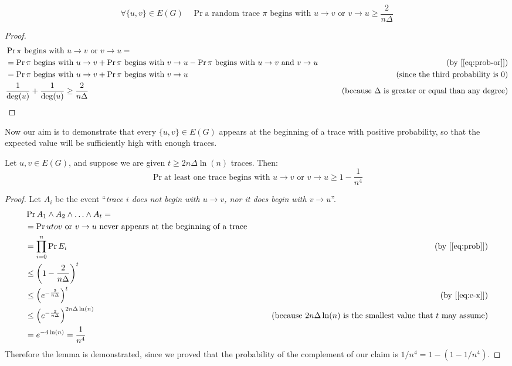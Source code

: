 \begin{lem}
    \[
        \forall \{u, v\} \in E(G) \quad \Pr{\text{a random trace } \pi \text{ begins with } u \to v \text{ or } v \to u} \geq \frac{2}{n \Delta}
    \]
\end{lem}

\begin{proof}
    \begin{align*}
        &\Pr{\pi \text{ begins with } u \to v \text{ or } v \to u}=&\\
        &= \Pr{\pi \text{ begins with } u \to v} + \Pr{\pi \text{ begins with } v \to u} - \Pr{\pi \text{ begins with } u \to v \text{ and } v \to u}&\tag{by [\ref{eq:prob-or}]}\\
        &= \Pr{\pi \text{ begins with } u \to v} + \Pr{\pi \text{ begins with } v \to u} &\tag{since the third probability is 0}\\
        &\frac{1}{\deg(u)} + \frac{1}{\deg(u)} \geq \frac{2}{n \Delta}&\tag{because $\Delta$ is greater or equal than any degree}
    \end{align*}
\end{proof}

Now our aim is to demonstrate that every $\{u, v\} \in E(G)$ appears at the beginning of a trace with positive probability, so that the expected value will be sufficiently high with enough traces.

\begin{lem}
    Let ${u,v} \in E(G)$, and suppose we are given $t \geq 2n \Delta \ln(n)$ traces. Then:
    \[
        \Pr{\text{at least one trace begins with } u \to v \text{ or } v \to u} \geq 1 - \frac{1}{n^4}
    \]
\end{lem}

\begin{proof}
    Let $A_i$ be the event ``\textit{trace $i$ does not begin with $u \to v$, nor it does begin with $v \to u$}''.
    \begin{align*}
        &\Pr{A_1 \wedge A_2 \wedge \ldots \wedge A_t} = &\\
        &=\Pr{u to v \text{ or } v \to u \text{ never appears at the beginning of a trace}}&\\
        &=\prod_{i=0}^{n}\Pr{E_i}&\tag{by [\ref{eq:prob}]}\\
        &\leq \left(1 - \frac{2}{n \Delta}\right)^t&\\
        &\leq \left(e^{-\frac{2}{n \Delta}}\right)^t&\tag{by [\ref{eq:e-x}]}\\
        &\leq \left(e^{-\frac{2}{n \Delta}}\right)^{2n \Delta \ln(n)}& \tag{because $2n \Delta \ln(n)$ is the smallest value that $t$ may assume}\\
        &=e^{-4 \ln(n)} = \frac{1}{n^4}&
    \end{align*}
    Therefore the lemma is demonstrated, since we proved that the probability of the complement of our claim is $1/n^4 = 1 - (1-1/n^4)$.
\end{proof}

